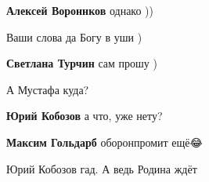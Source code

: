 \begin{itemize}
\begin{itemize}
\textbf{Алексей Вороннков} однако ))
\end{itemize}

 
Ваши слова да Богу в уши )

\begin{itemize}
 
\textbf{Светлана Турчин} сам прошу )
\end{itemize}

 
А Мустафа куда?🤔

\begin{itemize}
 
\textbf{Юрий Кобозов} а что, уже нету?

 
\textbf{Максим Гольдарб} оборонпромит ещё😂

 
Юрий Кобозов гад. А ведь Родина ждёт

\end{itemize}



\end{itemize}
